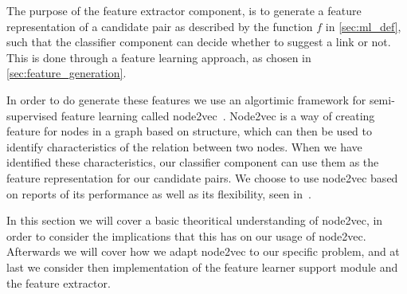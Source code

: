 The purpose of the feature extractor component, is to generate a feature representation of a candidate pair as described by the function $f$ in \cref{sec:ml_def}, such that the classifier component can decide whether to suggest a link or not. This is done through a feature learning approach, as chosen in \cref{sec:feature_generation}.

In order to do generate these features we use an algortimic framework for semi-supervised feature learning called node2vec~\cite{node2vec}. Node2vec is a way of creating feature for nodes in a graph based on structure, which can then be used to identify characteristics of the relation between two nodes. When we have identified these characteristics, our classifier component can use them as the feature representation for our candidate pairs. We choose to use node2vec based on reports of its performance as well as its flexibility, seen in~\cite{node2vec}.

In this section we will cover a basic theoritical understanding of node2vec, in order to consider the implications that this has on our usage of node2vec. Afterwards we will cover how we adapt node2vec to our specific problem, and at last we consider then implementation of the feature learner support module and the feature extractor.







